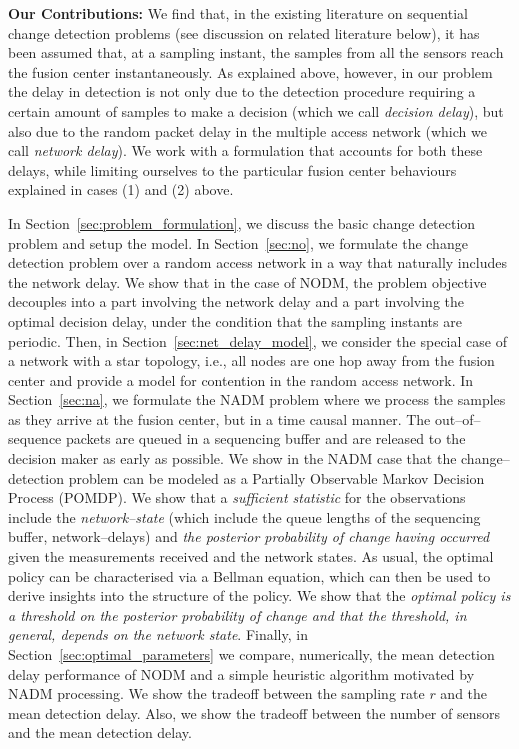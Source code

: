 \documentclass[acmtosn]{acmtrans2m}
\begin{document}
\noindent
\textbf{Our Contributions:} We find that, in the existing literature
on sequential change detection problems (see discussion on related literature 
below), it has been assumed
that, at a sampling instant, the samples from all the sensors reach
the fusion center instantaneously.  As explained above, however, in
our problem the delay in detection is not only due to the detection
procedure requiring a certain amount of samples to make a decision 
(which we call \emph{decision delay}), but also due to the random 
packet delay in the multiple access network (which we call 
\emph{network delay}). We work with a formulation that accounts for 
both these delays, while limiting ourselves to the particular fusion 
center behaviours explained in cases (1) and (2) above.

In Section~\ref{sec:problem_formulation}, we discuss the basic change
detection problem and setup the model. In Section~\ref{sec:no}, we
formulate the change detection problem over a random access network in a
way that naturally includes the network delay. We show that in the case
of {\sf NODM}, the problem objective decouples into a part involving the
network delay and a part involving the optimal decision delay, under the
condition that the sampling instants are periodic. Then, in
Section~\ref{sec:net_delay_model}, we consider the special case of a
network with a star topology, i.e., all nodes are one hop away from the
fusion center and provide a model for contention in the random access
network. In Section~\ref{sec:na}, we formulate the {\sf NADM} problem
where we process the samples as they arrive at the fusion center, but in
a time causal manner. The out--of--sequence packets are queued in a
sequencing buffer and are released to the decision maker as early as
possible. We show in the {\sf NADM} case that the change--detection
problem can be modeled as a Partially Observable Markov Decision Process
(POMDP). We show that a {\em sufficient statistic} for the observations
include the {\em network--state} (which include the queue lengths of the
sequencing buffer, network--delays) and {\em the posterior probability
of change having occurred} given the measurements received and the
network states. As usual, the optimal policy can be characterised via a
Bellman equation, which can then be used to derive insights into the
structure of the policy. We show that the {\em optimal policy is a
threshold on the posterior probability of change and that the threshold,
in general, depends on the network state}. Finally, in
Section~\ref{sec:optimal_parameters} we compare, numerically, the mean
detection delay performance of {\sf NODM} and a simple heuristic
algorithm motivated by {\sf NADM} processing. We show the tradeoff
between the sampling rate $r$ and the mean detection delay. Also, we
show the tradeoff between the number of sensors and the mean detection
delay. 
\end{document}
